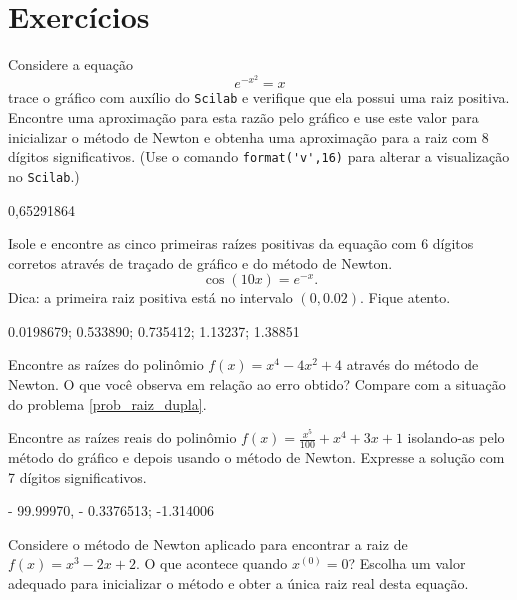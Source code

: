 \documentclass[main.tex]{subfiles}
\begin{document}
\section*{Exercícios}

\ifisscilab
\begin{Exercise}\label{new1} Considere a equação
  $$e^{-x^2}=x$$
trace o gráfico com auxílio do \verb+Scilab+ e verifique que ela possui uma raiz positiva. Encontre uma aproximação para esta razão pelo gráfico e use este valor para inicializar o método de Newton e obtenha uma aproximação para a raiz com 8 dígitos significativos. (Use o comando \verb+format('v',16)+ para alterar a visualização no \verb+Scilab+.)
\end{Exercise}
\begin{Answer}
  \begin{tiny}
0,65291864    
  \end{tiny}
\end{Answer}
\fi

\begin{Exercise}\label{new2} Isole e encontre as cinco primeiras raízes positivas da equação com 6 dígitos corretos através de traçado de gráfico e do método de Newton.
$$\cos(10x)=e^{-x}.$$ Dica: a primeira raiz positiva está no intervalo $(0,0.02)$. Fique atento.
\end{Exercise}
\begin{Answer}
 0.0198679; 0.533890; 0.735412; 1.13237; 1.38851
\end{Answer}


\begin{Exercise}\label{new3} Encontre as raízes do polinômio $f(x)=x^4-4x^2+4$ através do método de Newton. O que você observa em relação ao erro obtido? Compare com a situação do problema \ref{prob_raiz_dupla}.
\end{Exercise}

\begin{Exercise}\label{new4} Encontre as raízes reais do polinômio $f(x)=\frac{x^5}{100}+x^4+3x+1$ isolando-as pelo método do gráfico e depois usando o método de Newton. Expresse a solução com 7 dígitos significativos.
\end{Exercise}
\begin{Answer}
 - 99.99970, - 0.3376513; -1.314006
\end{Answer}

\begin{Exercise}Considere o método de Newton aplicado para encontrar a raiz de $f(x)=x^3-2x+2$. O que acontece quando $x^{(0)}=0$? Escolha um valor adequado para inicializar o método e obter a única raiz real desta equação.
\end{Exercise}
\end{document}

